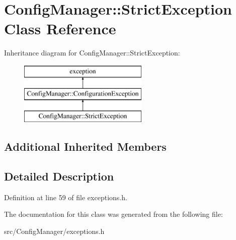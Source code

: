 \hypertarget{class_config_manager_1_1_strict_exception}{}\section{Config\+Manager\+:\+:Strict\+Exception Class Reference}
\label{class_config_manager_1_1_strict_exception}
Inheritance diagram for Config\+Manager\+:\+:Strict\+Exception\+:\begin{figure}[H]
\begin{center}
\leavevmode
\includegraphics[height=3.000000cm]{class_config_manager_1_1_strict_exception}
\end{center}
\end{figure}
\subsection*{Additional Inherited Members}


\subsection{Detailed Description}


Definition at line 59 of file exceptions.\+h.



The documentation for this class was generated from the following file\+:\begin{DoxyCompactItemize}
\item 
src/\+Config\+Manager/exceptions.\+h\end{DoxyCompactItemize}
